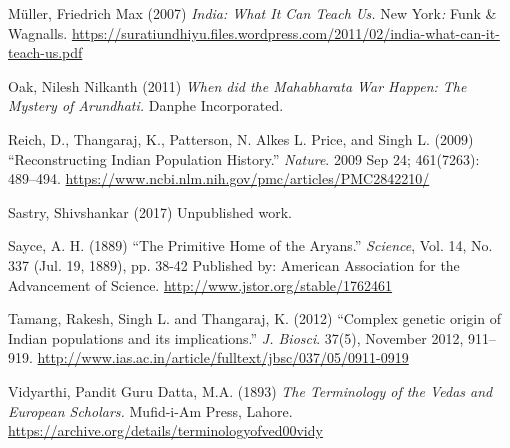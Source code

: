 \begin{thebibliography}{99}
  Müller, Friedrich Max (2007) \textit{India: What It Can Teach Us. }New York\textit{: }Funk \& Wagnalls. \url{https://suratiundhiyu.files.wordpress.com/2011/02/india-what-can-it-teach-us.pdf}

  Oak, Nilesh Nilkanth (2011) \textit{When did the Mahabharata War Happen: The Mystery of Arundhati.} Danphe Incorporated.

  Reich, D., Thangaraj, K., Patterson, N. Alkes L. Price, and Singh L. (2009) “Reconstructing Indian Population History.” \textit{Nature}. 2009 Sep 24; 461(7263): 489–494. \url{https://www.ncbi.nlm.nih.gov/pmc/articles/PMC2842210/}

  Sastry, Shivshankar (2017) Unpublished work.

  Sayce, A. H. (1889) “The Primitive Home of the Aryans.” \textit{Science}, Vol. 14, No. 337 (Jul. 19, 1889), pp. 38-42 Published by: American Association for the Advancement of Science. \url{http://www.jstor.org/stable/1762461}

  Tamang, Rakesh, Singh L. and Thangaraj, K. (2012) “Complex genetic origin of Indian populations and its implications.” \textit{J. Biosci}. 37(5), November 2012, 911–919. \url{http://www.ias.ac.in/article/fulltext/jbsc/037/05/0911-0919}

  Vidyarthi, Pandit Guru Datta, M.A. (1893) \textit{The Terminology of the Vedas and European Scholars.} Mufid-i-Am Press, Lahore. \url{https://archive.org/details/terminologyofved00vidy}

 \end{thebibliography}

